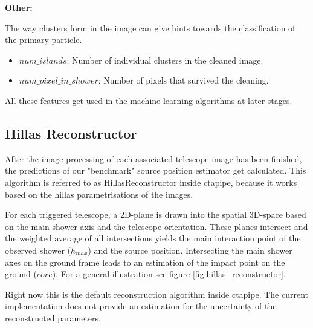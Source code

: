 \textbf{Other:}

The way clusters form in the image can give hints towards the classification of the primary particle.
\begin{itemize}
    \item{$num\_islands$: Number of individual clusters in the cleaned image.}
    \item{$num\_pixel\_in\_shower$: Number of pixels that survived the cleaning.}
\end{itemize}

All these features get used in the machine learning algorithms at later stages.

\subsection{Hillas Reconstructor}  %
After the image processing of each associated telescope image has been finished,
the predictions of our "benchmark" source position estimator get calculated.
This algorithm is referred to as HillasReconstructor inside ctapipe, because 
it works based on the hillas parametrisations of the images.

For each triggered telescope, a 2D-plane is drawn into the spatial 3D-space based on the main shower 
axis and the telescope orientation. These planes intersect and 
the weighted average of all intersections yields the 
main interaction point of the observed shower ($h_{max}$) and the source position.
Intersecting the main shower axes on the ground frame leads to 
an estimation of the impact point on the ground ($core$).
For a general illustration see figure \ref{fig:hillas_reconstructor}.

Right now this is the default reconstruction algorithm inside ctapipe.
The current implementation does not provide an 
estimation for the uncertainty of the reconstructed parameters.

